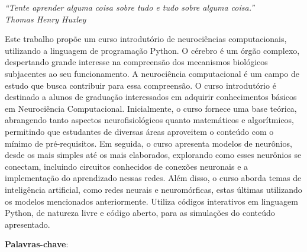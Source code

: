 \documentclass[
	12pt,				%
	openright,			%
	oneside,			%
	a4paper,			%
	chapter=TITLE,		%
	english,			%
	french,				%
	spanish,			%
	brazil				%
	]{abntex2}
\theoremstyle{definition}
\begin{document}
\begin{epigrafe}
    \vspace*{\fill}
	\begin{flushright}
		\textit{``Tente aprender alguma coisa sobre tudo e tudo sobre alguma coisa.''\\
		Thomas Henry Huxley}
	\end{flushright}
\end{epigrafe}

\setlength{\absparsep}{18pt}
\begin{resumo}
Este trabalho propõe um curso introdutório de neurociências computacionais, utilizando a linguagem de programação Python. O cérebro é um órgão complexo, despertando grande interesse na compreensão dos mecanismos biológicos subjacentes ao seu funcionamento. A neurociência computacional é um campo de estudo que busca contribuir para essa compreensão. O curso introdutório é destinado a alunos de graduação interessados em adquirir conhecimentos básicos em Neurociência Computacional. Inicialmente, o curso fornece uma base teórica, abrangendo tanto aspectos neurofisiológicos quanto matemáticos e algorítmicos, permitindo que estudantes de diversas áreas aproveitem o conteúdo com o mínimo de pré-requisitos. Em seguida, o curso apresenta modelos de neurônios, desde os mais simples até os mais elaborados, explorando como esses neurônios se conectam, incluindo circuitos conhecidos de conexões neuronais e a implementação do aprendizado nessas redes. Além disso, o curso aborda temas de inteligência artificial, como redes neurais e neuromórficas, estas últimas utilizando os modelos mencionados anteriormente. Utiliza códigos interativos em linguagem Python, de natureza livre e código aberto, para as simulações do conteúdo apresentado.
%

\textbf{Palavras-chave}: \imprimirpalavraschave
\end{resumo}
\end{document}
